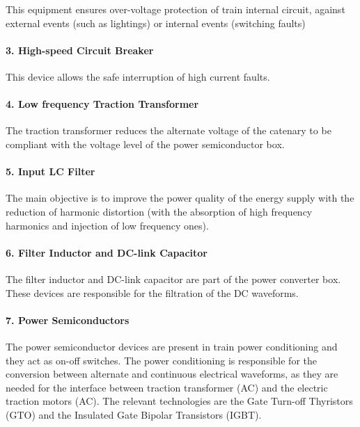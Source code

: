 	This equipment ensures over-voltage protection of train internal circuit, against external events (such as lightings) or internal events (switching faults)
	
\paragraph{3. High-speed Circuit Breaker\\}
	
	This device allows the safe interruption of high current faults.
	
\paragraph{4. Low frequency Traction Transformer\\}
	
	The traction transformer reduces the alternate voltage of the catenary to be compliant with the voltage level of the power semiconductor box.
	
\paragraph{5. Input LC Filter\\}

	The main objective is to improve the power quality of the energy supply with the reduction of harmonic distortion (with the absorption of high frequency harmonics and injection of low frequency ones).

\paragraph{6. Filter Inductor and DC-link Capacitor\\}

	The filter inductor and DC-link capacitor are part of the power converter box. These devices are responsible for the filtration of the DC waveforms.
	
\paragraph{7. Power Semiconductors\\}

	The power semiconductor devices are present in train power conditioning and they act as on-off switches. The power conditioning is responsible for the conversion between alternate and continuous  electrical waveforms, as they are needed for the interface between traction transformer (AC) and the electric traction motors (AC). The relevant technologies are the Gate Turn-off Thyristors (GTO) and the Insulated Gate Bipolar Transistors (IGBT).

